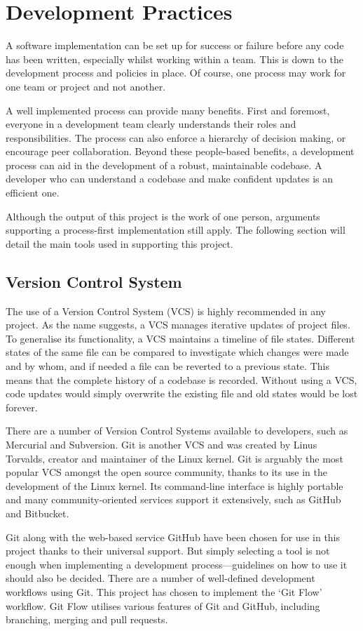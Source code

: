 \chapter{Development Practices}
  A software implementation can be set up for success or failure before any code has been written, especially whilst working within a team. This is down to the development process and policies in place. Of course, one process may work for one team or project and not another.

  A well implemented process can provide many benefits. First and foremost, everyone in a development team clearly understands their roles and responsibilities. The process can also enforce a hierarchy of decision making, or encourage peer collaboration. Beyond these people-based benefits, a development process can aid in the development of a robust, maintainable codebase. A developer who can understand a codebase and make confident updates is an efficient one.

  Although the output of this project is the work of one person, arguments supporting a process-first implementation still apply. The following section will detail the main tools used in supporting this project. 

  \section{Version Control System}
    The use of a Version Control System (VCS) is highly recommended in any project. As the name suggests, a VCS manages iterative updates of project files. To generalise its functionality, a VCS maintains a timeline of file states. Different states of the same file can be compared to investigate which changes were made and by whom, and if needed a file can be reverted to a previous state. This means that the complete history of a codebase is recorded. Without using a VCS, code updates would simply overwrite the existing file and old states would be lost forever.

    There are a number of Version Control Systems available to developers, such as Mercurial and Subversion. Git is another VCS and was created by Linus Torvalds, creator and maintainer of the Linux kernel. Git is arguably the most popular VCS amongst the open source community, thanks to its use in the development of the Linux kernel. Its command-line interface is highly portable and many community-oriented services support it extensively, such as GitHub and Bitbucket.

    Git along with the web-based service GitHub have been chosen for use in this project thanks to their universal support. But simply selecting a tool is not enough when implementing a development process---guidelines on how to use it should also be decided. There are a number of well-defined development workflows using Git. This project has chosen to implement the `Git Flow' workflow. Git Flow utilises various features of Git and GitHub, including branching, merging and pull requests. 


